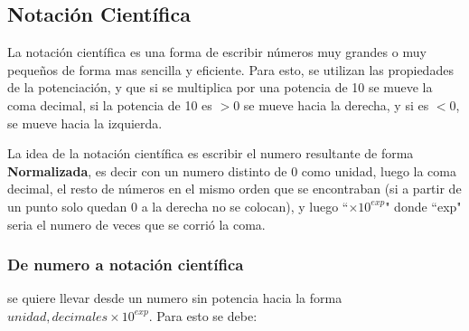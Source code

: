 \documentclass[12pt]{article}
\newcommand{\comillas}[1]{``#1"}
\begin{document}
\newpage
\subsection{Notación Científica}
    La notación científica es una forma de escribir números muy grandes o muy pequeños
    de forma mas sencilla y eficiente. Para esto, se utilizan las propiedades de
    la potenciación, y que si se multiplica por una potencia de 10 se mueve la
    coma decimal, si la potencia de 10 es $>0$ se mueve hacia la derecha, y si
    es $<0$, se mueve hacia la izquierda.

    La idea de la notación científica es escribir el numero resultante de forma
    \textbf{Normalizada}, es decir con un numero distinto de 0 como unidad, luego
    la coma decimal, el resto de números en el mismo orden que se encontraban (si
    a partir de un punto solo quedan 0 a la derecha no se colocan), y luego
    \comillas{$\times10^{exp}$} donde \comillas{exp} seria el numero de veces que
    se corrió la coma.


\subsubsection*{De numero a notación científica}
    se quiere llevar desde un numero sin potencia hacia la forma
    $unidad, decimales \times10^{exp}$. Para esto se debe:
\end{document}
